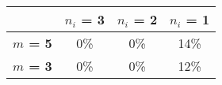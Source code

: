 \begin{tabular}{|l|c|c|c|}
\hline
&\textbf{$n_i$ = 3}&\textbf{$n_i$ = 2}&\textbf{$n_i$ = 1}\\\hline
\textbf{$m$ = 5}&0\%&0\%&14\%\\\hline
\textbf{$m$ = 3}&0\%&0\%&12\%\\\hline
\end{tabular}
